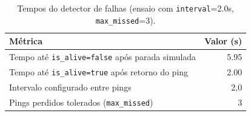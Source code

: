 \begin{table}[!t]
\centering
\caption{Tempos do detector de falhas (ensaio com \texttt{interval}=2.0s, \texttt{max\_missed}=3).}
\label{tab:heartbeat}
\begin{tabular}{@{}l r@{}}
\toprule
Métrica & Valor (s) \\
\midrule
Tempo até \texttt{is\_alive=false} após parada simulada & 5.95 \\
Tempo até \texttt{is\_alive=true} após retorno do ping & 2.00 \\
Intervalo configurado entre pings & 2{,}0 \\
Pings perdidos tolerados (\texttt{max\_missed}) & 3 \\
\bottomrule
\end{tabular}
\end{table}
